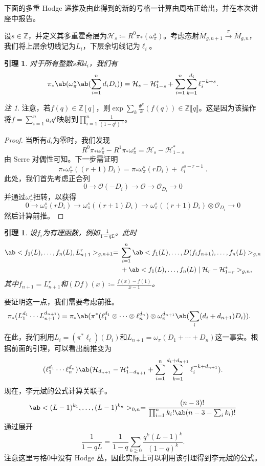 \documentclass{amsart}
\newtheorem{lem}[thm]{引理}
\theoremstyle{definition}
\theoremstyle{remark}
\newtheorem{rmk}[thm]{注}
\theoremstyle{plain}
\theoremstyle{definition}
\theoremstyle{remark}
\newcommand{\Z}{\mathbb{Z}}
\newcommand{\mc}[1]{\mathcal{#1}}
\newcommand{\1}{\mathbf{1}}
\newcommand{\2}{\mathbf{2}}
\newcommand{\3}{\mathbf{3}}
\newcommand{\ps}[1]{\llbracket #1 \rrbracket}
\begin{document}
下面的多重 Hodge 递推及由此得到的新的亏格一计算由周祐正给出，并在本次讲座中报告。

设\(s \in \Z\)，并定义其多重霍奇层为\(\mc{H}_s \coloneqq R^0 \pi_* (\omega_{\pi}^s)\)。考虑态射\(\bar{M}_{g,n+1} \xrightarrow{\pi} \bar{M}_{g,n}\)，我们将上层余切线记为\(L_i\)，下层余切线记为\(\ell_i\)。

\begin{lem}
对于所有整数\(s\)和\(d_i\)，我们有
    \[ \pi_*\ab(\omega_{\pi}^s\ab(\sum_{i=1}^n d_i D_i)) = \mc{H}_s-\mc{H}_{1-s}^* + \sum_{i=1}^n \sum_{k=1}^{d_i} \ell_i^{-k+s}. \]
\end{lem}

\begin{rmk}
    注意，若\(f(q) \in \Z[q]\)，则\(\exp \sum_k \frac{\Psi^k}{k} (f(q)) \in \Z \ps{q}\)。这是因为该操作将\(f = \sum_{i=1}^{n} a_i q^i\)映射到\(\prod_{i=1}^n \frac{1}{(1-q^i)^{a_i}}\)。
\end{rmk}

\begin{proof}
    当所有\(d_i\)为零时，我们发现
    \[ R^0 \pi_* \omega_{\pi}^s - R^1 \pi_* \omega_{\pi}^s = \mc{H}_s - \mc{H}_{1-s}^* \]
由 Serre 对偶性可知。下一步需证明
    \[ \pi_* \omega_{\pi}^s ((r+1)D_i) = \pi_* \omega_{\pi}^s(r D_i) + \ell_i^{s-r-1}. \]
此处，我们首先考虑正合列
    \[ 0 \to \mc{O} (-D_i) \to \mc{O} \to \mc{O}_{D_i} \to 0 \]
    并通过\(\omega_{\pi}^s\)扭转，以获得
    \[ 0 \to \omega_{\pi}^s(r D_i) \to \omega_{\pi}^s ((r+1)D_i) \to \omega_{\pi}^s ((r+1)D_i) \otimes \mc{O}_{D_i} \to 0 \]
    然后计算前推。
\end{proof}

\begin{lem}
    设\(f_i\)为有理函数，例如\(\frac{1}{1-q L}\)。此时
    \begin{align*}
        \ab<f_1(L), \ldots, f_n(L), L_{n+1}^r>_{g, n+1} ={}& \sum_{i=1}^n \ab<f_1(L), \ldots, D(f_i f_{n+1}), \ldots, f_n(L)>_{g, n} \\
        &+ \ab<f_1(L), \ldots, f_n(L) \mid \mc{H}_r - \mc{H}_{1-r}^*>_{g,n},
    \end{align*}
    其中\(f_{n+1} = L_{n+1}^r\)和\((Df)(x) \coloneqq \frac{f(x)-f(1)}{x-1}\)。
\end{lem}

要证明这一点，我们需要考虑前推。
\begin{align*}
    \pi_* (L_1^{d_1} \cdots L_{n+1}^{d_{n+1}}) &= \pi_* \ab(\pi^*(\ell_1^{d_1} \otimes \cdots \otimes \ell_n^{d_n}) \otimes \omega_{\pi}^{d_{n+1}}\ab(\sum_i (d_i+d_{n+1})D_i)).
\end{align*}
在此，我们利用\(L_i = (\pi^* \ell_i)(D_i)\)和\(L_{n+1} = \omega_{\pi}(D_1 + \cdots + D_n)\)这一事实。根据前面的引理，可以看出前推变为
\[ (\ell_1^{d_1} \cdots \ell_n^{d_n})\ab(\mc{H}_{d_{n+1}} - \mc{H}_{1-d_{n+1}}^* + \sum_{i=1}^n \sum_{k=1}^{d_i + d_{n+1}} \ell_i^{-k+d_{n+1}}). \]
现在，李元斌的公式计算关联子。
\[ \ab<(L-1)^{k_1}, \ldots, (L-1)^{k_n}>_{0,n} = \frac{(n-3)!}{\prod_{i=1}^n k_i! \ab(n-3-\sum_i k_i)!} \]
通过展开
\[ \frac{1}{1-qL} = \frac{1}{1-q} \sum_{k \geq 0} \frac{q^k(L-1)^k}{(1-q)^k}. \]
注意这里亏格\(0\)中没有 Hodge 丛，因此实际上可以利用该引理得到李元斌的公式。
\end{document}
